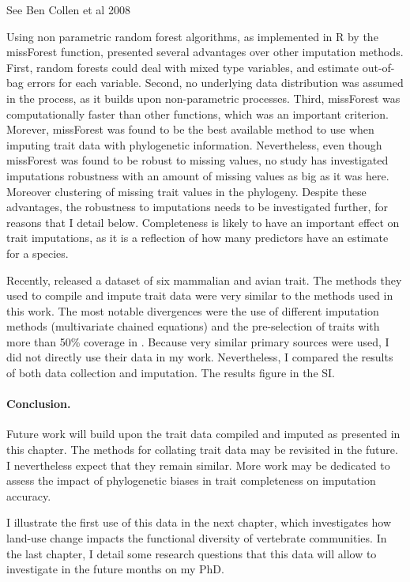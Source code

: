 See Ben Collen et al 2008


Using non parametric random forest algorithms, as implemented in R by the missForest function, presented several advantages over other imputation methods. First, random forests could deal with mixed type variables, and estimate out-of-bag errors for each variable. Second, no underlying data distribution was assumed in the process, as it builds upon non-parametric processes. Third, missForest was computationally faster than other functions, which was an important criterion. Morever, missForest was found to be the best available method to use when imputing trait data with phylogenetic information. Nevertheless, even though missForest was found to be robust to missing values, no study has investigated imputations robustness with an amount of missing values as big as it was here. Moreover clustering of missing trait values in the phylogeny.
Despite these advantages, the robustness to imputations needs to be investigated further, for reasons that I detail below.
Completeness is likely to have an important effect on trait imputations, as it is a reflection of how many predictors have an estimate for a species.

Recently, \citet{Cooke2019} released a dataset of six mammalian and avian trait. The methods they used to compile and impute trait data were very similar to the methods used in this work. The most notable divergences were the use of different imputation methods (multivariate chained equations) and the pre-selection of traits with more than 50\% coverage in \citet{Cooke2019}. Because very similar primary sources were used, I did not directly use their data in my work. Nevertheless, I compared the results of both data collection and imputation. The results figure in the SI.
 


\paragraph{Conclusion.}
Future work will build upon the trait data compiled and imputed as presented in this chapter. The methods for collating trait data may be revisited in the future. I nevertheless expect that they remain similar. More work may be dedicated to assess the impact of phylogenetic biases in trait completeness on imputation accuracy.

I illustrate the first use of this data in the next chapter, which investigates how land-use change impacts the functional diversity of vertebrate communities. In the last chapter, I detail some research questions that this data will allow to investigate in the future months on my PhD.
